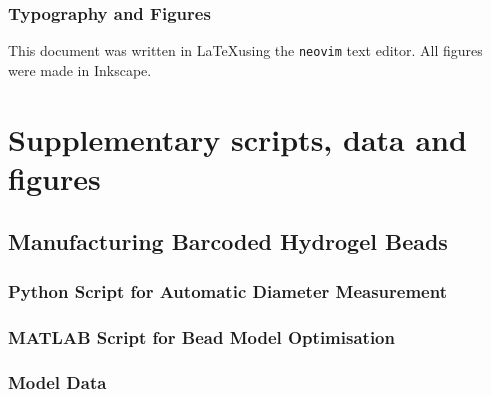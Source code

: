 \begin{appendix}
\begin{multicols}{2}
\subsection{Typography and Figures}
This document was written in \LaTeX using the \verb|neovim| text editor. All figures were made in Inkscape.\pms

\end{multicols}

\clearpage
\renewcommand{\thechapter}{S}
\renewcommand*{\thepage}{S - \arabic{page}}

\chapter{Supplementary scripts, data and figures}
\label{app:supp}

\section{Manufacturing Barcoded Hydrogel Beads}
\label{app:supp_beads}
\subsection{Python Script for Automatic Diameter Measurement}
\label{app:supp_python}


\subsection{MATLAB Script for Bead Model Optimisation}
\label{app:supp_matlab}


\newpage
\subsection{Model Data}
\label{app:supp_modeldata}


\end{appendix}
